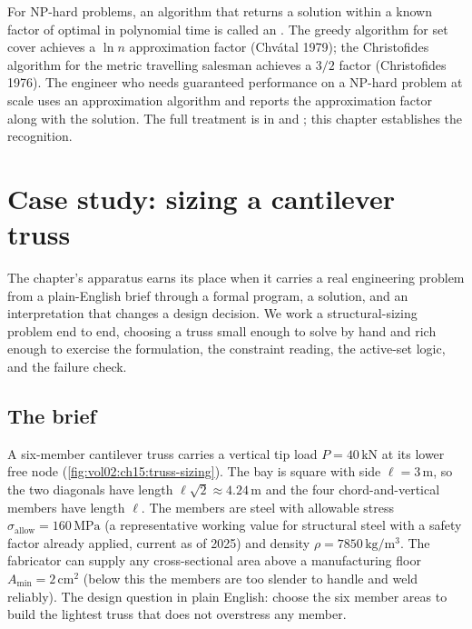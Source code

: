 For NP-hard problems, an algorithm that returns a solution
within a known factor of optimal in polynomial time is called an
. The greedy algorithm for set
cover achieves a $\ln n$ approximation factor (Chvátal 1979); the
Christofides algorithm for the metric travelling salesman
achieves a $3/2$ factor (Christofides 1976). The engineer who
needs guaranteed performance on a NP-hard problem at scale uses
an approximation algorithm and reports the approximation factor
along with the solution. The full treatment is in
\textcite{text:cormen-clrs} and \textcite{text:kleinberg-tardos};
this chapter establishes the recognition.

\section{Case study: sizing a cantilever truss}

The chapter's apparatus earns its place when it carries a real
engineering problem from a plain-English brief through a formal
program, a solution, and an interpretation that changes a design
decision. We work a structural-sizing problem end to end, choosing
a truss small enough to solve by hand and rich enough to exercise
the formulation, the constraint reading, the active-set logic, and
the failure check.

\subsection{The brief}

A six-member cantilever truss carries a vertical tip load $P =
40\,\si{\kilo\newton}$ at its lower free node
(\cref{fig:vol02:ch15:truss-sizing}). The bay is square with side
$\ell = 3\,\si{\meter}$, so the two diagonals have length
$\ell \sqrt{2} \approx 4.24\,\si{\meter}$ and the four
chord-and-vertical members have length $\ell$. The members are
steel with allowable stress $\sigma_{\mathrm{allow}} =
160\,\si{\mega\pascal}$ (a representative working value for
structural steel with a safety factor already applied, current as
of 2025) and density $\rho = 7850\,\si{\kilogram\per\meter\cubed}$.
The fabricator can supply any cross-sectional area above a
manufacturing floor $A_{\min} = 2\,\si{\centi\meter\squared}$ (below
this the members are too slender to handle and weld reliably). The
design question in plain English: choose the six member areas to
build the lightest truss that does not overstress any member.

